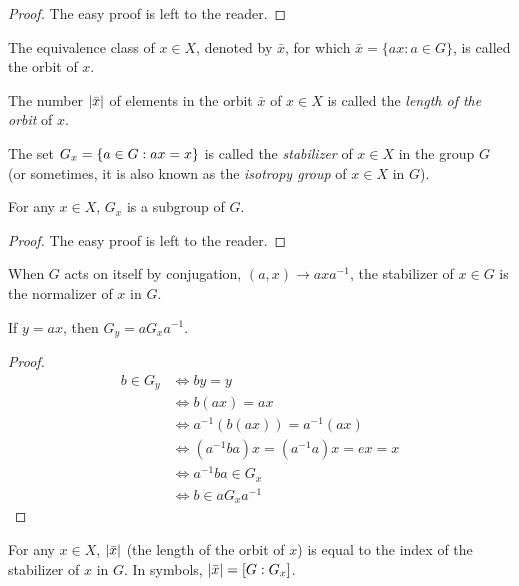 \documentclass[../main-sheet.tex]{subfiles}
\begin{document}
\begin{proof}
    The easy proof is left to the reader.
\end{proof}
\begin{defn}
    The equivalence class of \(x \in X \), denoted by \(\bar{x}\), for which \(\bar{x} = \{ax: a \in G\}\), is called the orbit of \(x\).
\end{defn}
\begin{defn}
    The number \(\left\vert\bar{x}\right\vert\) of elements in the orbit \(\bar{x}\) of \(x \in X\) is called the \emph{length of the orbit} of \(x\).
\end{defn}
\begin{defn}
    The set \(G_x = \left\{a \in G : ax = x\right\}\) is called the \emph{stabilizer} of \(x \in X\) in the group \(G\) (or sometimes, it is also known as the \emph{isotropy group} of \(x \in X\) in \(G\)).
\end{defn}
\begin{ex}
    For any \(x \in X\), \(G_x\) is a subgroup of \(G\).
\end{ex}
\begin{proof}
    The easy proof is left to the reader.
\end{proof}
\begin{note}
    When \(G\) acts on itself by conjugation, \((a, x) \to axa^{-1}\), the stabilizer of \(x \in G\) is the normalizer of \(x\) in \(G\).
\end{note}
\begin{ex}
    If \(y = ax\), then \(G_y = aG_x a^{-1}\).
\end{ex}
\begin{proof}
    \begin{align*}
        b \in G_y & \Leftrightarrow by = y\\
        &\Leftrightarrow b( ax ) = ax\\
        &\Leftrightarrow a^{-1}(b (ax)) = a^{-1}(ax)\\
        &\Leftrightarrow (a^{-1}ba) x = (a^{-1}a)x = ex = x\\
        &\Leftrightarrow a^{-1}ba \in G_x\\
        &\Leftrightarrow b \in aG_xa^{-1}
    \end{align*}
\end{proof}
\begin{thm}
    For any \(x \in X \), \(\left\vert\bar{x}\right\vert\) (the length of the orbit of \(x\)) is equal to the index of the stabilizer of \(x\) in \(G\). In symbols, \(\left\vert\bar{x}\right\vert= [G: G_x]\).
\end{thm}
\end{document}
